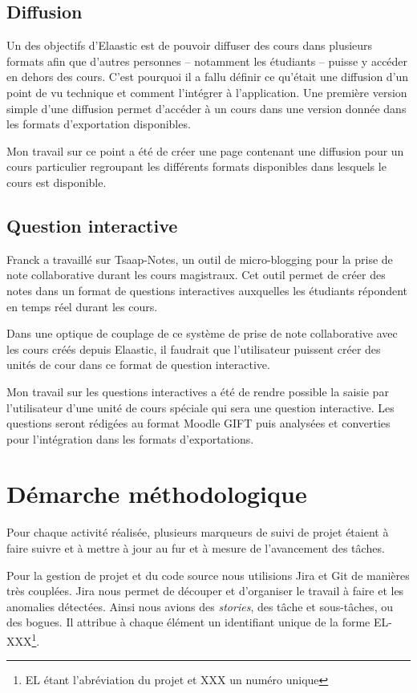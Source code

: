 \subsection{Diffusion}
Un des objectifs d'Elaastic est de pouvoir diffuser des cours dans plusieurs
formats afin que d'autres personnes -- notamment les étudiants -- puisse y
accéder en dehors des cours. C'est pourquoi il a fallu définir ce qu'était une
diffusion d'un point de vu technique et comment l'intégrer à l'application. Une
première version simple d'une diffusion permet d'accéder à un cours dans
une version donnée dans les formats d'exportation disponibles.

Mon travail sur ce point a été de créer une page contenant une diffusion pour un
cours particulier regroupant les différents formats disponibles dans lesquels le
cours est disponible.

\subsection{Question interactive}
Franck a travaillé sur Tsaap-Notes, un outil de micro-blogging pour la prise de
note collaborative durant les cours magistraux. Cet outil permet de créer des
notes dans un format de questions interactives auxquelles les étudiants
répondent en temps réel durant les cours.

Dans une optique de couplage de ce système de prise de note collaborative avec
les cours créés depuis Elaastic, il faudrait que l'utilisateur puissent créer des
unités de cour dans ce format de question interactive.

Mon travail sur les questions interactives a été de rendre possible la saisie par
l'utilisateur d'une unité de cours spéciale qui sera une question interactive.
Les questions seront rédigées au format Moodle GIFT puis analysées et converties
pour l'intégration dans les formats d'exportations.

\section{Démarche méthodologique}
Pour chaque activité réalisée, plusieurs marqueurs de suivi de projet étaient à
faire suivre et à mettre à jour au fur et à mesure de l'avancement des tâches.

Pour la gestion de projet et du code source nous utilisions Jira et Git de
manières très couplées. Jira nous permet de découper et d'organiser le travail à
faire et les anomalies détectées. Ainsi nous avions des {\em stories}, des tâche
et sous-tâches, ou des bogues. Il attribue à chaque élément un identifiant unique
de la forme EL-XXX\footnote{EL étant l'abréviation du projet et XXX un numéro
unique}.

